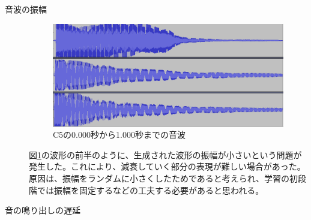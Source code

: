 \begin{description}

\item[音波の振幅]\mbox{}

\begin{figure}[t]
\begin{center}
\includegraphics[width=0.7\hsize]{figure/88_88/c5.png}
\caption{C5の0.000秒から1.000秒までの音波}
\label{fig:88_88_amp}
\end{center}
\end{figure}

図\ref{fig:88_88_amp}の波形の前半のように、生成された波形の振幅が小さいという問題が発生した。これにより、減衰していく部分の表現が難しい場合があった。原因は、振幅をランダムに小さくしたためであると考えられ、学習の初段階では振幅を固定するなどの工夫する必要があると思われる。
    
\item[音の鳴り出しの遅延]\mbox{}


\end{description}
